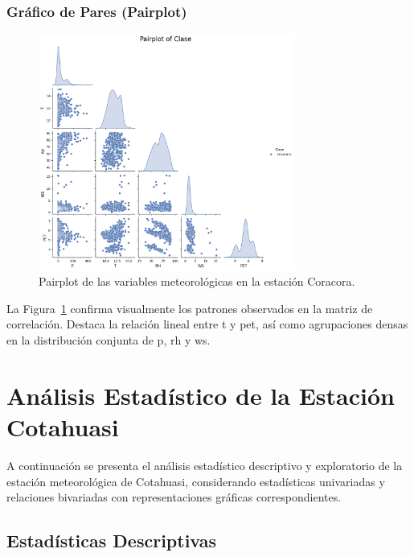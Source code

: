 \subsubsection*{Gráfico de Pares (Pairplot)}
\begin{figure}[htbp]
\centering
\includegraphics[width=0.75\textwidth]{resultados/por_estacion_meteorologica/Coracora/pairplot.png}
\caption{Pairplot de las variables meteorológicas en la estación Coracora.}
\label{fig:coracora_pairplot}
\end{figure}
La Figura~\ref{fig:coracora_pairplot} confirma visualmente los patrones observados en la matriz de correlación. Destaca la relación lineal entre \gls{t} y \gls{pet}, así como agrupaciones densas en la distribución conjunta de \gls{p}, \gls{rh} y \gls{ws}.






\section{Análisis Estadístico de la Estación Cotahuasi}

A continuación se presenta el análisis estadístico descriptivo y exploratorio de la estación meteorológica de Cotahuasi, considerando estadísticas univariadas y relaciones bivariadas con representaciones gráficas correspondientes.

\subsection{Estadísticas Descriptivas}

